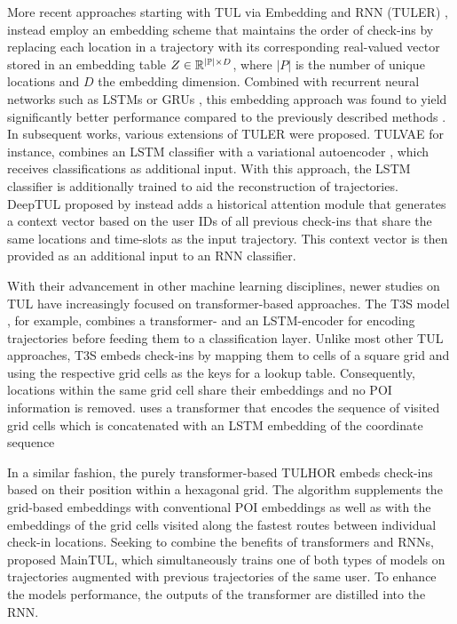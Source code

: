 \documentclass{article} %
\theoremstyle{definition}
\begin{document}
More recent approaches starting with TUL via Embedding and RNN (TULER) \citep{gaoIdentifyingHumanMobility2017}, instead employ an embedding scheme that maintains the order of check-ins by replacing each location in a trajectory with its corresponding real-valued vector stored in an embedding table $Z \in {\mathbb{R}}^{|{\mathbb{P}}| \times D}$, where $|P|$ is the number of unique locations and $D$ the embedding dimension.
Combined with recurrent neural networks such as LSTMs \citep{hochreiterLongShort1997} or GRUs \citep{choPropertiesNeuralMachine2014a}, this embedding approach was found to yield significantly better performance compared to the previously described methods \citep{gaoIdentifyingHumanMobility2017}.
In subsequent works, various extensions of TULER were proposed.
TULVAE \citep{zhouTrajectoryUserLinkingVariational2018} for instance, combines an LSTM classifier with a variational autoencoder \citep{kingmaAutoEncodingVariationalBayes2013a}, which receives classifications as additional input.
With this approach, the LSTM classifier is additionally trained to aid the reconstruction of trajectories.
DeepTUL proposed by \citet{miaoTrajectoryUserLinkingAttentive2020a} instead adds a historical attention module that generates a context vector based on the user IDs of all previous check-ins that share the same locations and time-slots as the input trajectory.
This context vector is then provided as an additional input to an RNN classifier.

With their advancement in other machine learning disciplines, newer studies on TUL have increasingly focused on transformer-based approaches.
The T3S model \citep{yangT3SEffectiveRepresentation2021}, for example, combines a transformer- and an LSTM-encoder for encoding trajectories before feeding them to a classification layer.
Unlike most other TUL approaches, T3S embeds check-ins by mapping them to cells of a square grid and using the respective grid cells as the keys for a lookup table.
Consequently, locations within the same grid cell share their embeddings and no POI information is removed.
uses a transformer that encodes the sequence of visited grid cells which is concatenated with an LSTM embedding of the coordinate sequence

In a similar fashion, the purely transformer-based TULHOR \citep{alsaeedTrajectoryUserLinkingUsing2023a} embeds check-ins based on their position within a hexagonal grid.
The algorithm supplements the grid-based embeddings with conventional POI embeddings as well as with the embeddings of the grid cells visited along the fastest routes between individual check-in locations.
Seeking to combine the benefits of transformers and RNNs, \citet{chenMutualDistillationLearning2022a} proposed MainTUL, which simultaneously trains one of both types of models on trajectories augmented with previous trajectories of the same user.
To enhance the models performance, the outputs of the transformer are distilled into the RNN.
\end{document}

